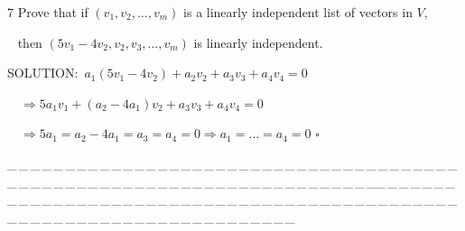 \documentclass[a4paper, 11pt, UTF8]{article}
\begin{document}
\begin{large}
{\timesbf\Large 7} {\timessl\Large 
Prove that if $(v_1,v_2,\dots,v_m)$ is a linearly independent list of vectors in $V$,}\par\,\,\,
{\timessl\Large then $(5v_1-4v_2,v_2, v_3,\dots,v_m)$ is linearly independent.
}\par
{\timesbf S\footnotesize{OLUTION:}}\,\,\,$a_1(5v_1-4v_2)+a_2 v_2+a_3 v_3+a_4 v_4=0$\par\qquad\quad\,\,\,\,
$\Rightarrow 5a_1 v_1+(a_2-4a_1)v_2+a_3 v_3+a_4 v_4=0$\par\qquad\quad\,\,\,\,
$\Rightarrow 5a_1=a_2-4a_1=a_3=a_4=0\Rightarrow a_1=\dots=a_4=0\,\,\square$\par
{\tiny \_\,\_\,\_\,\_\,\_\,\_\,\_\,\_\,\_\,\_\,\_\,\_\,\_\,\_\,\_\,\_\,\_\,\_\,\_\,\_\,\_\,\_\,\_\,\_\,\_\,\_\,\_\,\_\,\_\,\_\,\_\,\_\,\_\,\_\,\_\,\_\,\_\,\_\,\_\,\_\,\_\,\_\,\_\,\_\,\_\,\_\,\_\,\_\,\_\,\_\,\_\,\_\,\_\,\_\,\_\,\_\,\_\,\_\,\_\,\_\,\_\,\_\,\_\,\_\,\_\,\_\,\_\,\_\,\_\,\_\,\_\_\,\_\,\_\,\_\,\_\,\_\,\_\,\_\,\_\,\_\,\_\,\_\,\_\,\_\,\_\,\_\,\_\,\_\,\_\,\_\,\_\,\_\,\_\,\_\,\_\,\_\,\_\,\_\,\_\,\_\,\_\,\_\,\_\,\_\,\_\,\_\,\_\,\_\,\_\,\_\,\_\,\_\,\_\,\_\,\_\,\_\,\_\,\_\,\_\,\_\,\_\,\_\,\_\,\_\,\_\,\_\,\_\,\_\,\_\,\_\,\_\,\_\,\_\,\_\,\_\,\_\,\_\,\_\,\_\,\_\,\_}\par


\end{large}
\end{document}

